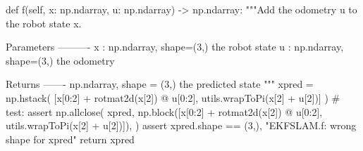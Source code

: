 \begin{pythoncode}
def f(self, x: np.ndarray, u: np.ndarray) -> np.ndarray:
    """Add the odometry u to the robot state x.

    Parameters
    ----------
    x : np.ndarray, shape=(3,)
    the robot state
    u : np.ndarray, shape=(3,)
    the odometry

    Returns
    -------
    np.ndarray, shape = (3,)
    the predicted state
    """
    xpred = np.hstack(
        [x[0:2] + rotmat2d(x[2]) @ u[0:2], utils.wrapToPi(x[2] + u[2])]
    )
    # test:
    assert np.allclose(
        xpred,
        np.block([x[0:2] + rotmat2d(x[2]) @ u[0:2],
                 utils.wrapToPi(x[2] + u[2])]),
    )
    assert xpred.shape == (3,), "EKFSLAM.f: wrong shape for xpred"
    return xpred
\end{pythoncode}